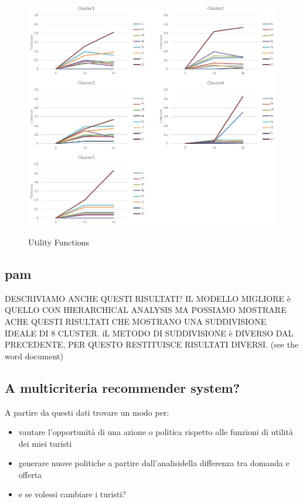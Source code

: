 \documentclass[a4paper]{article}
\begin{document}
\begin{figure}[h]
  \centering
    \includegraphics[width=\textwidth]{grafici2}\\
  \caption{Utility Functions}\label{gr2}
\end{figure}


\subsection{pam}
DESCRIVIAMO ANCHE QUESTI RISULTATI? IL MODELLO MIGLIORE è QUELLO CON HIERARCHICAL ANALYSIS MA POSSIAMO MOSTRARE ACHE QUESTI RISULTATI CHE MOSTRANO UNA SUDDIVISIONE IDEALE DI 8 CLUSTER. iL METODO DI SUDDIVISIONE è DIVERSO DAL PRECEDENTE, PER QUESTO RESTITUISCE RISULTATI DIVERSI. (see the word document)


\subsection{A multicriteria recommender system?}
A partire da questi dati trovare un modo per:
\begin{itemize}
\item{vautare l'opportunità di una azione o politica rispetto alle funzioni di utilità dei miei turisti}
\item{generare nuove politiche a partire dall'analisidella differenza tra domanda e offerta}
\item{e se volessi cambiare i turisti?}
\end{itemize}
\end{document}
